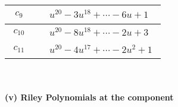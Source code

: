 \documentclass[1p]{elsarticle_modified}
\theoremstyle{definition}
\begin{document}
\begin{tabular}{m{50pt}|m{274pt}}
\hline $$\begin{aligned}c_{9}\end{aligned}$$&$\begin{aligned}
&u^{20}-3 u^{18}+\cdots-6 u+1
\end{aligned}$\\
\hline $$\begin{aligned}c_{10}\end{aligned}$$&$\begin{aligned}
&u^{20}-8 u^{18}+\cdots-2 u+3
\end{aligned}$\\
\hline $$\begin{aligned}c_{11}\end{aligned}$$&$\begin{aligned}
&u^{20}-4 u^{17}+\cdots-2 u^2+1
\end{aligned}$\\
\hline
\end{tabular}\\~\\
\newpage\renewcommand{\arraystretch}{1}
\flushleft \textbf{(v) Riley Polynomials at the component}\newline \\
\end{document}
